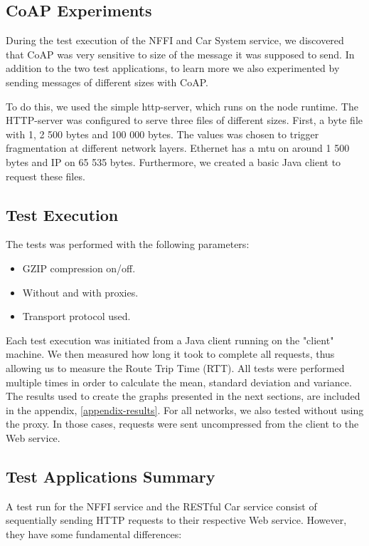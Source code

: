 \subsection{CoAP Experiments}

During the test execution of the NFFI and Car System service, we discovered that
CoAP was very sensitive to size of the message it was supposed to send. In
addition to the two test applications, to learn more we also experimented
by sending messages of different sizes with CoAP.

To do this, we used the simple http-server\cite{http-server-homepage}, which
runs on the node runtime. The HTTP-server was configured to serve three files of
different sizes. First, a byte file with  1, 2 500 bytes and 100 000 bytes. The
values was chosen to trigger fragmentation at different network layers. Ethernet
has a \gls{mtu} on around 1 500 bytes and IP on 65 535 bytes. Furthermore, we
created a basic Java client to request these files.

\subsection{Test Execution}

The tests was performed with the following parameters:

\begin{itemize}
	\item GZIP compression on/off.
	\item Without and with proxies.
    \item Transport protocol used.
\end{itemize}

Each test execution was initiated from a Java client running on the "client"
machine. We then measured how long it took to complete all requests, thus
allowing us to measure the Route Trip Time (RTT). All tests were performed
multiple times in order to calculate the mean, standard deviation and variance.
The results used to create the graphs presented in the next sections, are
included in the appendix, \cref{appendix-results}. For all networks, we also
tested without using the proxy. In those cases, requests were sent uncompressed
from the client to the Web service.


\subsection{Test Applications Summary}

A test run for the NFFI service and the RESTful Car service consist of
sequentially sending HTTP requests to their respective Web service. However,
they have some fundamental differences:

